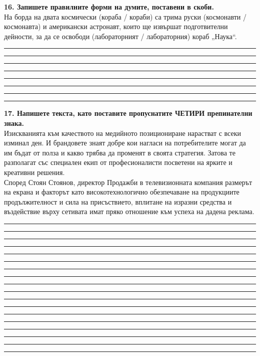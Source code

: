 \documentclass[12pt,a4paper]{article}
\begin{document}
\vspace{0.6cm}

\noindent
\textbf{16. Запишете правилните форми на думите, поставени в скоби.} \\

\vspace{-0.2cm}
\noindent
На борда на двата космически (кораба / кораби) са трима руски (космонавти / космонавта) и американски астронавт, които ще извършат подготвителни дейности, за да се освободи (лабораторният / лабораторния) кораб „Наука“.

\vspace{0.2cm}
\noindent\rule{\linewidth}{0.4pt}
\noindent\rule{\linewidth}{0.4pt}
\noindent\rule{\linewidth}{0.4pt}
\noindent\rule{\linewidth}{0.4pt}
\noindent\rule{\linewidth}{0.4pt}
\noindent\rule{\linewidth}{0.4pt}
\noindent\rule{\linewidth}{0.4pt}
\noindent\rule{\linewidth}{0.4pt}

\vspace{0.6cm}

\noindent
\textbf{17. Напишете текста, като поставите пропуснатите ЧЕТИРИ препинателни знака.} \\
Изискванията към качеството на медийното позициониране нарастват с всеки изминал ден. И брандовете знаят добре кои нагласи на потребителите могат да им бъдат от полза и какво трябва да променят в своята стратегия. Затова те разполагат със специален екип от професионалисти посветени на ярките и креативни решения. \\
Според Стоян Стоянов, директор Продажби в телевизионната компания размерът на екрана и факторът като високотехнологично обезпечаване на продукциите продължителност и сила на присъствието, вплитане на изразни средства и въздействие върху сетивата имат пряко отношение към успеха на дадена реклама.

\vspace{0.2cm}
\noindent\rule{\linewidth}{0.4pt}
\noindent\rule{\linewidth}{0.4pt}
\noindent\rule{\linewidth}{0.4pt}
\noindent\rule{\linewidth}{0.4pt}
\noindent\rule{\linewidth}{0.4pt}
\noindent\rule{\linewidth}{0.4pt}
\noindent\rule{\linewidth}{0.4pt}
\noindent\rule{\linewidth}{0.4pt}
\noindent\rule{\linewidth}{0.4pt}
\noindent\rule{\linewidth}{0.4pt}
\noindent\rule{\linewidth}{0.4pt}
\noindent\rule{\linewidth}{0.4pt}
\noindent\rule{\linewidth}{0.4pt}
\noindent\rule{\linewidth}{0.4pt}
\noindent\rule{\linewidth}{0.4pt}
\noindent\rule{\linewidth}{0.4pt}
\noindent\rule{\linewidth}{0.4pt}
\noindent\rule{\linewidth}{0.4pt}

\newpage
\end{document}
